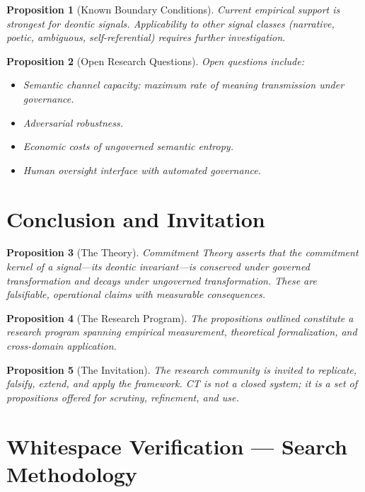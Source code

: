 \documentclass[11pt,a4paper]{article}
\newtheorem{proposition}{Proposition}[section]
\begin{document}
\begin{proposition}[Known Boundary Conditions]
Current empirical support is strongest for deontic signals. Applicability to other signal classes (narrative, poetic, ambiguous, self-referential) requires further investigation.
\end{proposition}

\begin{proposition}[Open Research Questions]
Open questions include:
\begin{itemize}[leftmargin=*,nosep]
    \item Semantic channel capacity: maximum rate of meaning transmission under governance.
    \item Adversarial robustness.
    \item Economic costs of ungoverned semantic entropy.
    \item Human oversight interface with automated governance.
\end{itemize}
\end{proposition}

\section{Conclusion and Invitation}

\begin{proposition}[The Theory]
Commitment Theory asserts that the commitment kernel of a signal---its deontic invariant---is conserved under governed transformation and decays under ungoverned transformation. These are falsifiable, operational claims with measurable consequences.
\end{proposition}

\begin{proposition}[The Research Program]
The propositions outlined constitute a research program spanning empirical measurement, theoretical formalization, and cross-domain application.
\end{proposition}

\begin{proposition}[The Invitation]
The research community is invited to replicate, falsify, extend, and apply the framework. CT is not a closed system; it is a set of propositions offered for scrutiny, refinement, and use.
\end{proposition}

\appendix

\section{Whitespace Verification --- Search Methodology}
\end{document}
